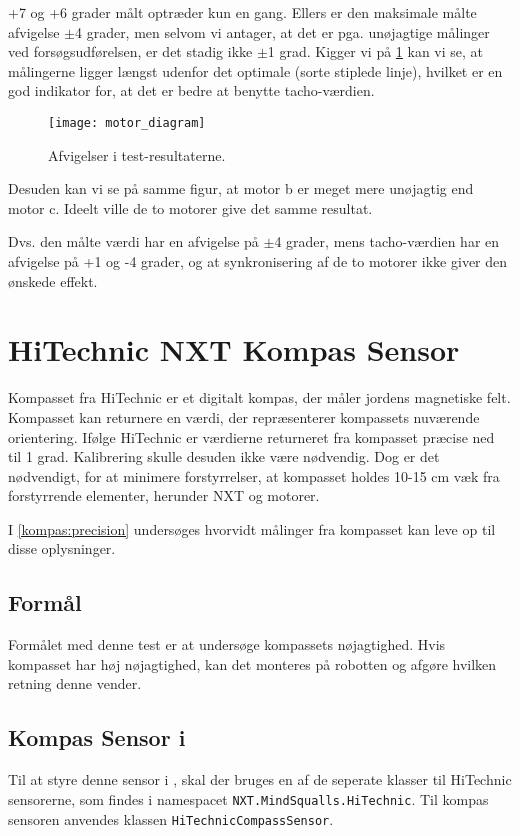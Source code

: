 +7 og +6 grader målt optræder kun en gang.
Ellers er den maksimale målte afvigelse $\pm$4 grader, men selvom vi antager, at det er pga. unøjagtige målinger ved forsøgsudførelsen, er det stadig ikke $\pm$1 grad.
Kigger vi på \cref{sensor:motor_sensor_diagram} kan vi se, at målingerne ligger længst udenfor det optimale (sorte stiplede linje), hvilket er en god indikator for, at det er bedre at benytte tacho-værdien.

\begin{figure}
\texttt{[image: motor\_diagram]}
\caption{Afvigelser i test-resultaterne.}
\label{sensor:motor_sensor_diagram}
\end{figure}

Desuden kan vi se på samme figur, at motor b er meget mere unøjagtig end motor c.
Ideelt ville de to motorer give det samme resultat.

Dvs. den målte værdi har en afvigelse på $\pm$4 grader, mens tacho-værdien har en afvigelse på +1 og -4 grader, og at synkronisering af de to motorer ikke giver den ønskede effekt.

\section{HiTechnic NXT Kompas Sensor}
Kompasset fra HiTechnic er et digitalt kompas, der måler jordens magnetiske felt.
Kompasset kan returnere en værdi, der repræsenterer kompassets nuværende orientering.
Ifølge HiTechnic er værdierne returneret fra kompasset præcise ned til 1 grad.
Kalibrering skulle desuden ikke være nødvendig.
Dog er det nødvendigt, for at minimere forstyrrelser, at kompasset holdes 10-15 cm væk fra forstyrrende elementer, herunder \lego NXT og motorer.\cite{hitechnic_compass}

I \cref{kompas:precision} undersøges hvorvidt målinger fra kompasset kan leve op til disse oplysninger.

\subsection{Formål}
Formålet med denne test er at undersøge kompassets nøjagtighed.
Hvis kompasset har høj nøjagtighed, kan det monteres på robotten og afgøre hvilken retning denne vender.

\subsection{Kompas Sensor i \mindsqualls}
Til at styre denne sensor i \mindsqualls, skal der bruges en af de seperate klasser til HiTechnic sensorerne, som findes i namespacet \lstinline[style=csharp]!NXT.MindSqualls.HiTechnic!.
Til kompas sensoren anvendes klassen \lstinline[style=csharp]!HiTechnicCompassSensor!.

